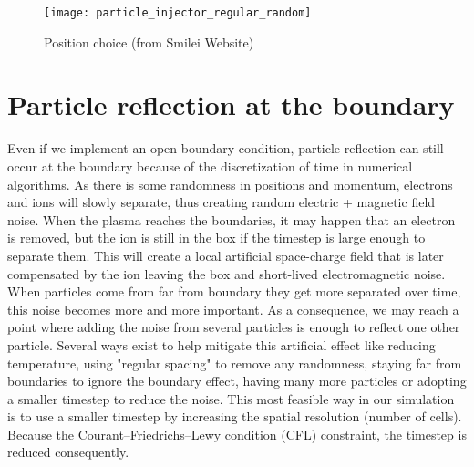 \begin{figure}[ht]
    \centering
    {\texttt{[image: particle\_injector\_regular\_random]}}
    \caption{Position choice (from Smilei Website)}
    \label{fig:position}  
\end{figure}


\section{Particle reflection at the boundary}

Even if we implement an open boundary condition, particle reflection can still occur at the boundary because of the discretization of time in numerical algorithms. As there is some randomness in positions and momentum, electrons and ions will slowly separate, thus creating random electric + magnetic field noise. When the plasma reaches the boundaries, it may happen that an electron is removed, but the ion is still in the box if the timestep is large enough to separate them. This will create a local artificial space-charge field that is later compensated by the ion leaving the box and short-lived electromagnetic noise. When particles come from far from boundary they get more separated over time, this noise becomes more and more important. As a consequence, we may reach a point where adding the noise from several particles is enough to reflect one other particle. Several ways exist to help mitigate this artificial effect like reducing temperature, using "regular spacing" to remove any randomness, staying far from boundaries to ignore the boundary effect, having many more particles or adopting a smaller timestep to reduce the noise. This most feasible way in our simulation is to use a smaller timestep by increasing the spatial resolution (number of cells). Because the Courant–Friedrichs–Lewy condition (CFL) constraint, the timestep is reduced consequently.